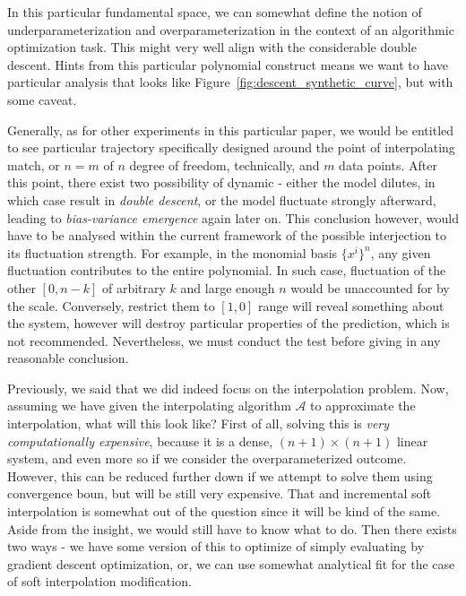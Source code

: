 In this particular fundamental space, we can somewhat define the notion of underparameterization and overparameterization in the context of an algorithmic optimization task. This might very well align with the considerable double descent. Hints from this particular polynomial construct means we want to have particular analysis that looks like Figure~\ref{fig:descent_synthetic_curve}, but with some caveat. 

Generally, as for other experiments in this particular paper, we would be entitled to see particular trajectory specifically designed around the point of interpolating match, or $n=m$ of $n$ degree of freedom, technically, and $m$ data points. After this point, there exist two possibility of dynamic - either the model dilutes, in which case result in \textit{double descent}, or the model fluctuate strongly afterward, leading to \textit{bias-variance emergence} again later on. This conclusion however, would have to be analysed within the current framework of the possible interjection to its fluctuation strength. For example, in the monomial basis $\{x^{i}\}^{n}$, any given fluctuation contributes to the entire polynomial. In such case, fluctuation of the other $[0,n-k]$ of arbitrary $k$ and large enough $n$ would be unaccounted for by the scale. Conversely, restrict them to $[1,0]$ range will reveal something about the system, however will destroy particular properties of the prediction, which is not recommended. Nevertheless, we must conduct the test before giving in any reasonable conclusion.

Previously, we said that we did indeed focus on the interpolation problem. Now, assuming we have given the interpolating algorithm $\mathcal{A}$ to approximate the interpolation, what will this look like? First of all, solving this is \textit{very computationally expensive}, because it is a dense, $(n+1)\times(n+1)$ linear system, and even more so if we consider the overparameterized outcome. However, this can be reduced further down if we attempt to solve them using convergence boun, but will be still very expensive. That and incremental soft interpolation is somewhat out of the question since it will be kind of the same. Aside from the insight, we would still have to know what to do. Then there exists two ways - we have some version of this to optimize of simply evaluating by gradient descent optimization, or, we can use somewhat analytical fit for the case of soft interpolation modification. 

